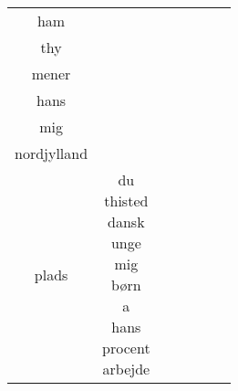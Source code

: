 \begin{table*}[h]
\begin{tabular}{c|c|c|c|c|c|c}
\\ ham \\ thy \\ mener \\ hans \\ mig \\ nordjylland \\ plads} & \makecell{du \\ thisted \\ dansk \\ unge \\ mig \\ børn \\ a \\ hans \\ procent \\ arbejde} \\
		\bottomrule
	\end{tabular}
	\label{tab:author_top_words}
\end{table*}
